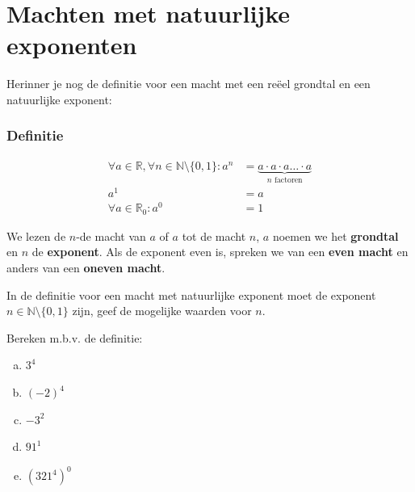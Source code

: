 \documentclass[12pt,twoside,a4paper]{article}
\begin{document}
\thispagestyle{empty}
\clearpage

\tableofcontents
\thispagestyle{empty}
\clearpage


\pagestyle{fancy}
\fancyhead[RE,LO]{}

\cleardoublepage
\section{Machten met natuurlijke exponenten}

Herinner je nog de definitie voor een macht met een reëel grondtal en een natuurlijke exponent:

\subsubsection*{Definitie}

\begin{mdframed}
\begin{align*}
\forall a \in \mathbb{R}, \forall n\in \mathbb{N}\setminus\{0,1\} : a^n &= \underbrace{a\cdot a\cdot a \ldots \cdot a}_{\mbox{$n$ factoren}}\\
a^1 &= a\\
\forall a \in \mathbb{R}_0 : a^0 &= 1
\end{align*}
\end{mdframed}

We lezen de $n$-de macht van $a$ of $a$ tot de macht $n$, $a$ noemen we het {\bf grondtal} en $n$ de {\bf exponent}. Als de exponent even is, spreken we van een {\bf even macht} en anders van een {\bf oneven macht}.

\begin{oefening}
In de definitie voor een macht met natuurlijke exponent moet de exponent $n\in \mathbb{N}\setminus\{0,1\}$ zijn, geef de mogelijke waarden voor $n$.
\end{oefening}

\begin{oefening}
Bereken m.b.v. de definitie:
\begin{multicols}{2}
\begin{enumerate}[(a)]
  \itemsep1em
  \item $3^4$
  \item $(-2)^4$
  \item $-3^2$
  \item $91^1$
  \item $\left(321^4\right)^0$
\end{enumerate}
\end{multicols}
\end{oefening}
\end{document}
